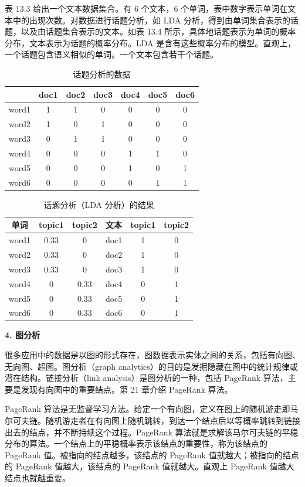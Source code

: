 \documentclass[UTF8, 12pt, fontset=fandol, oneside]{ctexart}
\begin{document}
表 13.3 给出一个文本数据集合。有 6 个文本，6 个单词，表中数字表示单词在文本中的出现次数。对数据进行话题分析，如 LDA 分析，得到由单词集合表示的话题，以及由话题集合表示的文本。如表 13.4 所示，具体地话题表示为单词的概率分布，文本表示为话题的概率分布。LDA 是含有这些概率分布的模型。直观上，一个话题包含语义相似的单词。一个文本包含若干个话题。

\begin{table}[htbp]
\centering
\caption{话题分析的数据}
\begin{tabular}{c|cccccc}
\toprule
 & doc1 & doc2 & doc3 & doc4 & doc5 & doc6\\
\midrule
word1 & 1 & 1 & 0 & 0 & 0 & 0\\
word2 & 1 & 0 & 1 & 0 & 0 & 0\\
word3 & 0 & 1 & 1 & 0 & 0 & 0\\
word4 & 0 & 0 & 0 & 1 & 1 & 0\\
word5 & 0 & 0 & 0 & 1 & 0 & 1\\
word6 & 0 & 0 & 0 & 0 & 1 & 1\\
\bottomrule
\end{tabular}
\end{table}

\begin{table}[htbp]
\centering
\caption{话题分析（LDA 分析）的结果}
\begin{tabular}{c|cc@{\qquad}c|cc}
\toprule
单词 & topic1 & topic2 & 文本 & topic1 & topic2\\
\midrule
word1 & 0.33 & 0 & doc1 & 1 & 0\\
word2 & 0.33 & 0 & doc2 & 1 & 0\\
word3 & 0.33 & 0 & doc3 & 1 & 0\\
word4 & 0 & 0.33 & doc4 & 0 & 1\\
word5 & 0 & 0.33 & doc5 & 0 & 1\\
word6 & 0 & 0.33 & doc6 & 0 & 1\\
\bottomrule
\end{tabular}
\end{table}

\noindent\textbf{4. 图分析}

很多应用中的数据是以图的形式存在，图数据表示实体之间的关系，包括有向图、无向图、超图。图分析（graph analytics）的目的是发掘隐藏在图中的统计规律或潜在结构。链接分析（link analysis）是图分析的一种，包括 PageRank 算法，主要是发现有向图中的重要结点。第 21 章介绍 PageRank 算法。

PageRank 算法是无监督学习方法。给定一个有向图，定义在图上的随机游走即马尔可夫链。随机游走者在有向图上随机跳转，到达一个结点后以等概率跳转到链接出去的结点，并不断持续这个过程。PageRank 算法就是求解该马尔可夫链的平稳分布的算法。一个结点上的平稳概率表示该结点的重要性，称为该结点的 PageRank 值。被指向的结点越多，该结点的 PageRank 值就越大；被指向的结点的 PageRank 值越大，该结点的 PageRank 值就越大。直观上 PageRank 值越大结点也就越重要。
\end{document}
